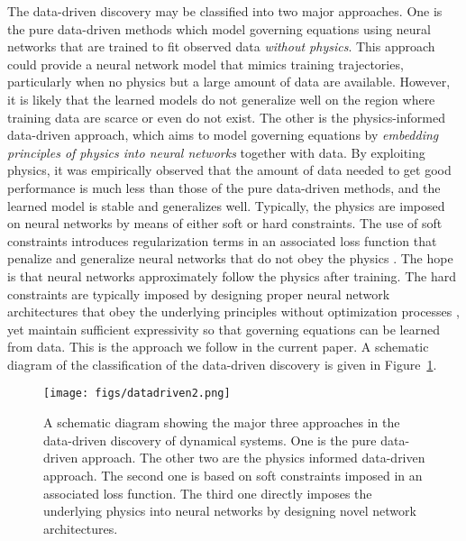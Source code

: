 \documentclass[openacc]{rsproca_new}%
\begin{document}
The data-driven discovery may be classified into two major approaches.
One is the pure data-driven methods\cite{ChenRBD18,KidgerMFL20} which model governing equations
using neural networks that are trained to
fit observed data \textit{without physics}. 
This approach could provide a neural network 
model that mimics training trajectories,
particularly 
when no physics but a large amount of data are available.
However, it is likely that the learned models 
do not generalize well on the region where 
training data are scarce or even do not exist.
The other is the physics-informed data-driven approach,
which aims to model governing equations
by \textit{embedding principles of physics
into neural networks} together with data.
By exploiting physics,
it was empirically observed that 
the amount of data needed to get good performance
is much less than those of the pure data-driven methods,
and the learned model is stable and generalizes well.
Typically, the physics are imposed
on neural networks
by means of either soft or hard constraints.
The use of soft constraints 
introduces regularization terms 
in an associated loss function 
that penalize and generalize neural networks
that do not obey the physics \cite{greydanus2019hamiltonian,raissi2019physics,cranmer2020lagrangian,hernandez2021structure}.
The hope is that neural networks 
approximately follow the physics 
after training.
The hard constraints are typically imposed 
by designing proper neural network
architectures that  
obey the underlying principles
without optimization processes \cite{jin2020learning, jin2020sympnets},
yet maintain sufficient expressivity 
so that 
governing equations 
can be learned from data.
This is the approach we follow in the current paper.
A schematic diagram
of the classification of the data-driven discovery
is given in Figure~\ref{fig:DD}.
\begin{figure}[ht]
    \centering
    \texttt{[image: figs/datadriven2.png]}
    \caption{A schematic diagram showing the
    major three approaches in the data-driven discovery of dynamical systems.
    One is the pure data-driven approach.
    The other two are the physics informed data-driven approach.
    The second one is based on soft constraints imposed in an associated loss function.
    The third one directly imposes the underlying physics into neural networks by designing novel network architectures.}
    \label{fig:DD}
\end{figure}
\end{document}
